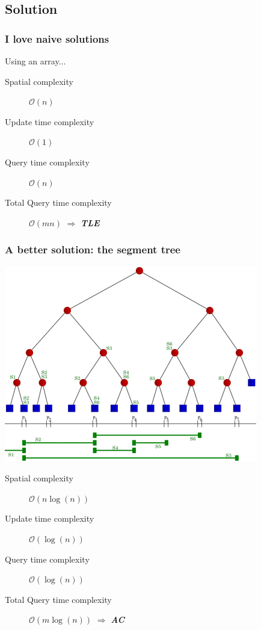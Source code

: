 \documentclass[10pt,svgnames,usenames,table]{beamer} %
\newcommand{\bigoh}{\mathcal{O}}
\begin{document}
\subsection{Solution}
\begin{frame}
\frametitle{I love naive solutions}
Using an array...
\begin{description}
\item[Spatial complexity] $\bigoh(n)$
\item [Update time complexity] $\bigoh(1)$
\item [Query time complexity] $\bigoh(n)$
\item [Total Query time complexity] $\bigoh(mn)$ $\Rightarrow$ \textit{\textbf{TLE}}
\end{description}
\end{frame}
\begin{frame}
\frametitle{A better solution: the segment tree}
\begin{center}
\includegraphics[scale=0.4]{segment_tree.jpg} 
\begin{description}
\item[Spatial complexity] $\bigoh(n\log(n))$
\item [Update time complexity] $\bigoh(\log(n))$
\item [Query time complexity] $\bigoh(\log(n))$
\item [Total Query time complexity] $\bigoh(m\log(n))$ $\Rightarrow$ \textit{\textbf{AC}}
\end{description}
\end{center}
\end{frame}
\end{document}
